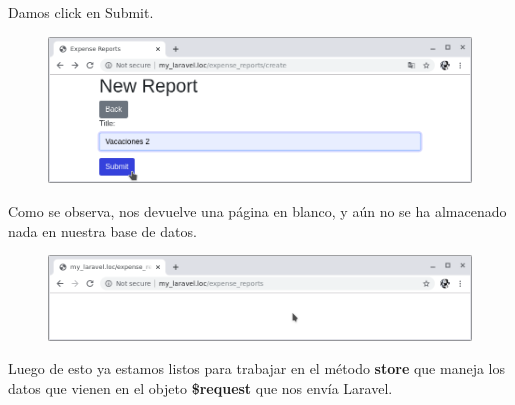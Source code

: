 \documentclass{article}
\begin{document}
Damos click en Submit.

\begin{figure}[h!]
  \centering
  \includegraphics[scale=0.5]{./Pictures/062_submit_again.png}
\end{figure}

Como se observa, nos devuelve una página en blanco, y aún no se ha almacenado
nada en nuestra base de datos.\\

\begin{figure}[h!]
  \centering
  \includegraphics[scale=0.5]{./Pictures/063_blank_page.png}
\end{figure}


Luego de esto ya estamos listos para trabajar en el método \textbf{store} que
maneja los datos que vienen en el objeto \textbf{\$request} que nos envía
Laravel.\\
\end{document}
